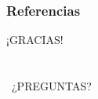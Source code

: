 \documentclass[xcolor=dvipsnames]{beamer}
\begin{document}
\renewcommand{\addcontentsline}[3]{}%
\renewcommand{\section}[2]{}%

\begin{frame}[allowframebreaks]
	\frametitle{Referencias}
	
		
\end{frame}

\begin{frame}{}
  \centering \Large
	{\fontsize{40}{50}\selectfont ¡GRACIAS!}
	\\\ %
	\\\
	\\\
	{\fontsize{40}{50}\selectfont ¿PREGUNTAS?}
\end{frame}
\end{document}
